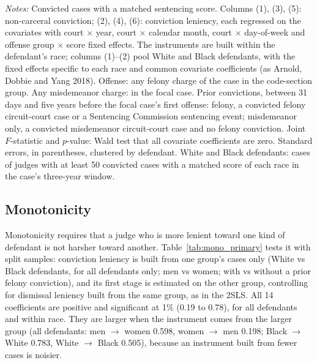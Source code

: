 \documentclass[11pt]{article}
\newcommand{\tabnote}[1]{\par\vspace{0.6ex}\begin{minipage}{\linewidth}\linespread{1}\footnotesize\textit{Notes:} #1\end{minipage}}
\newcommand{\racesamplenote}{White and Black defendants: cases of judges with at least 50 convicted cases with a matched score of each race in the case's three-year window.}
\begin{document}
\begin{table}[H]
\centering
\caption{Balance: non-carceral conviction and conviction leniency}\label{tab:balance_primary}
{\renewcommand{\arraystretch}{0.85}\resizebox{0.85\textwidth}{!}{}}
\tabnote{Convicted cases with a matched sentencing score. Columns (1), (3), (5): non-carceral conviction; (2), (4), (6): conviction leniency, each regressed on the covariates with court $\times$ year, court $\times$ calendar month, court $\times$ day-of-week and offense group $\times$ score fixed effects. The instruments are built within the defendant's race; columns (1)--(2) pool White and Black defendants, with the fixed effects specific to each race and common covariate coefficients (as Arnold, Dobbie and Yang 2018). Offense: any felony charge of the case in the code-section group. Any misdemeanor charge: in the focal case. Prior convictions, between 31 days and five years before the focal case's first offense: felony, a convicted felony circuit-court case or a Sentencing Commission sentencing event; misdemeanor only, a convicted misdemeanor circuit-court case and no felony conviction. Joint $F$-statistic and $p$-value: Wald test that all covariate coefficients are zero. Standard errors, in parentheses, clustered by defendant. \racesamplenote}
\end{table}

\subsection{Monotonicity}\label{sec:monotonicity}

Monotonicity requires that a judge who is more lenient toward one kind of defendant is not harsher toward another. Table~\ref{tab:mono_primary} tests it with split samples: conviction leniency is built from one group's cases only (White vs Black defendants, for all defendants only; men vs women; with vs without a prior felony conviction), and its first stage is estimated on the other group, controlling for dismissal leniency built from the same group, as in the 2SLS. All 14 coefficients are positive and significant at 1\% (0.19 to 0.78), for all defendants and within race. They are larger when the instrument comes from the larger group (all defendants: men $\rightarrow$ women 0.598, women $\rightarrow$ men 0.198; Black $\rightarrow$ White 0.783, White $\rightarrow$ Black 0.505), because an instrument built from fewer cases is noisier.
\end{document}
